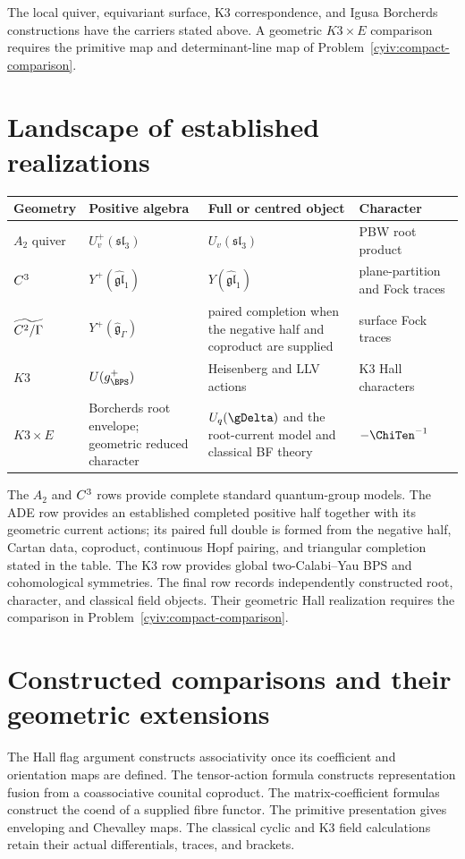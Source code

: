 The local quiver, equivariant surface, K3 correspondence, and Igusa Borcherds constructions have the carriers stated above.
A geometric $K3\times E$ comparison requires the primitive map and determinant-line map of Problem~\ref{cyiv:compact-comparison}.

\chapter{Landscape of established realizations}
\begin{center}
\footnotesize
\begin{tabularx}{0.99\textwidth}{@{}>{\raggedright\arraybackslash}p{}>{\raggedright\arraybackslash}p{}>{\raggedright\arraybackslash}X>{\raggedright\arraybackslash}p{}@{}}
\toprule
\textbf{Geometry}&\textbf{Positive algebra}&\textbf{Full or centred object}&\textbf{Character}\\
\midrule
$A_2$ quiver&$U_v^+(\mathfrak{sl}_3)$&$U_v(\mathfrak{sl}_3)$&PBW root product\\
$C^3$&$Y^+(\widehat{\mathfrak{gl}}_1)$&$Y(\widehat{\mathfrak{gl}}_1)$&plane-partition and Fock traces\\
$\widetilde{C^2/\Gamma}$&$Y^+(\widehat{\mathfrak g}_\Gamma)$&paired completion when the negative half and coproduct are supplied&surface Fock traces\\
$K3$&$U(\mathfrak g_{\BPS}^+)$&Heisenberg and LLV actions&K3 Hall characters\\
$K3\times E$&Borcherds root envelope; geometric reduced character&$U_q(\gDelta)$ and the root-current model and classical BF theory&$-\ChiTen^{-1}$\\
\bottomrule
\end{tabularx}
\end{center}
The $A_2$ and $C^3$ rows provide complete standard quantum-group models. The ADE row provides an established completed positive half together with its geometric current actions; its paired full double is formed from the negative half, Cartan data, coproduct, continuous Hopf pairing, and triangular completion stated in the table. The K3 row provides global two-Calabi--Yau BPS and cohomological symmetries. The final row records independently constructed root, character, and classical field objects.
Their geometric Hall realization requires the comparison in Problem~\ref{cyiv:compact-comparison}.

\chapter{Constructed comparisons and their geometric extensions}
The Hall flag argument constructs associativity once its coefficient
and orientation maps are defined.
The tensor-action formula constructs representation fusion from a
coassociative counital coproduct.
The matrix-coefficient formulas construct the coend of a supplied
fibre functor.
The primitive presentation gives enveloping and Chevalley maps.
The classical cyclic and K3 field calculations retain their actual
differentials, traces, and brackets.

